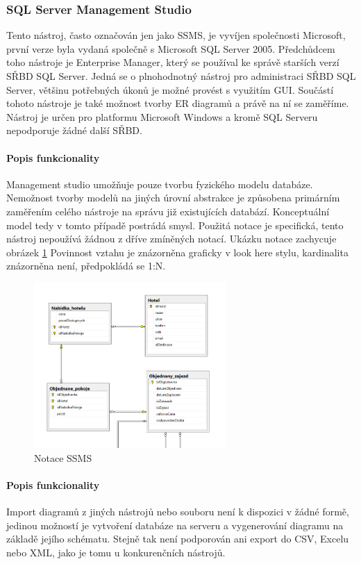 \documentclass[czech,bachelor,public,dept460,male,oneside]{diploma}
\begin{document}
		\subsubsection{SQL Server Management Studio}
		Tento nástroj, často označován jen jako SSMS, je vyvíjen společnosti Microsoft, první verze byla vydaná společně s Microsoft SQL Server 2005. Předchůdcem toho nástroje je Enterprise Manager, který se používal ke správě starších verzí SŘBD SQL Server. Jedná se o plnohodnotný nástroj pro administraci SŘBD SQL Server, většinu potřebných úkonů je možné provést s využitím GUI. Součástí tohoto nástroje je také možnost tvorby ER diagramů a právě na ní se zaměříme. Nástroj je určen pro platformu Microsoft Windows a kromě SQL Serveru nepodporuje žádné další SŘBD.
		
		\paragraph{Popis funkcionality}
		Management studio umožňuje pouze tvorbu fyzického modelu databáze. Nemožnost tvorby modelů na jiných úrovní abstrakce je způsobena primárním zaměřením celého nástroje na správu již existujících databází. Konceptuální model tedy v tomto případě postrádá smysl. Použitá notace je specifická, tento nástroj nepoužívá žádnou z dříve zmíněných notací. Ukázku notace zachycuje obrázek \ref{fig:notSSMS} Povinnost vztahu je znázorněna graficky v look here stylu, kardinalita znázorněna není, předpokládá se 1:N. 
		
		\begin{figure}[!h]
			\centering
			\includegraphics[width=0.65\textwidth]{Figures/EditorSSMS}
			\caption[Notace SSMS]{Notace SSMS}
			\label{fig:notSSMS}
		\end{figure}
		
		\paragraph{Popis funkcionality}
		Import diagramů z jiných nástrojů nebo souboru není k dispozici v žádné formě, jedinou možností je vytvoření databáze na serveru a vygenerování diagramu na základě jejího schématu. Stejně tak není podporován ani export do CSV, Excelu nebo XML, jako je tomu u konkurenčních nástrojů. 
		
\end{document}

